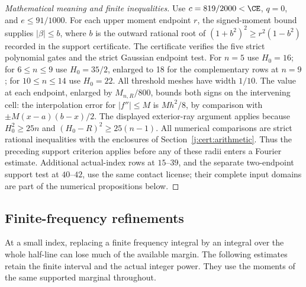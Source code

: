 \begin{proof}[Mathematical meaning and finite inequalities]
Use $c=819/2000<\CE$, $q=0$, and $e\le91/1000$.
For each upper moment endpoint $r$, the signed-moment bound supplies
$|\beta|\le b$, where $b$ is the outward rational root of
$(1+b^2)^2\ge r^2(1-b^2)$ recorded in the support certificate.
The certificate verifies the five strict polynomial gates and the strict
Gaussian endpoint test. For $n=5$ use $H_0=16$; for $6\le n\le9$
use $H_0=35/2$, enlarged to 18 for the complementary rows at $n=9$;
for $10\le n\le14$ use $H_0=22$. All threshold meshes have width
$1/10$. The value at each endpoint, enlarged by $M_{n,R}/800$,
bounds both signs on the intervening cell: the interpolation error for
$|f''|\le M$ is $M h^2/8$, by comparison with
$\pm M(x-a)(b-x)/2$. The displayed exterior-ray argument applies
because $H_0^2\ge25n$ and $(H_0-R)^2\ge25(n-1)$.
All numerical comparisons are strict rational inequalities with the
enclosures of Section~\ref{j:cert:arithmetic}. Thus the preceding support
criterion applies before any of these radii enters a Fourier estimate.
Additional actual-index rows at $15$--$39$, and the separate two-endpoint
support test at $40$--$42$, use the same contact license; their complete
input domains are part of the numerical propositions below.
\end{proof}

\subsection{Finite-frequency refinements}
\label{j:finite:small-fourier}
At a small index, replacing a finite frequency integral by an integral
over the whole half-line can lose much of the available margin. The
following estimates retain the finite interval and the actual integer
power. They use the moments of the same supported marginal throughout.

